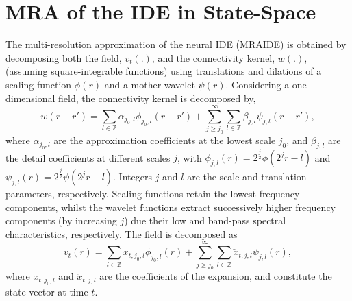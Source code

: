 \documentclass[journal,a4paper]{IEEEtran}
\newcommand{\dean}[1]{\textcolor{green}{#1}}
\begin{document}
\section{MRA of the IDE in State-Space}
The multi-resolution approximation of the neural IDE (MRAIDE) is obtained by decomposing both the field, $v_t(.)$, and the connectivity kernel, $w(.)$, (assuming square-integrable functions) using translations and dilations of a scaling function $\phi(r)$ and a mother wavelet $\psi(r)$. Considering a one-dimensional field, the connectivity kernel is decomposed by,
\begin{equation}
 w\left(r-r'\right)=\sum_{l \in \mathbb{Z}}\alpha_{j_0,l}\phi_{j_0,l}\left(r-r'\right)+\sum_{j\geq j_0}^{\infty} \sum_{l \in \mathbb{Z}}\beta_{j,l}\psi_{j,l}\left(r-r'\right), 
\label{eq:KernelExpansion}
\end{equation}
where $\alpha_{j_0,l}$ are the approximation coefficients at the lowest scale $j_0$, and $\beta_{j,l}$ are the detail coefficients at different scales $j$, with $\phi_{j,l}\left(r\right)=2^{\frac{j}{2}}\phi\left(2^jr-l\right) $ and $\psi_{j,l}\left(r\right)=2^{\frac{j}{2}}\psi\left(2^jr-l\right)$. Integers $j$ and $l$ are the scale and translation parameters, respectively. Scaling functions retain the lowest frequency components, whilst the wavelet functions extract successively higher frequency components (by increasing $j$) due their low and band-pass spectral characteristics, respectively. The field is decomposed as
\begin{equation}
 v_t\left(r\right)=\sum_{l \in \mathbb{Z}}x_{t,j_{0},l}\phi_{j_{0},l}\left(r\right)+\sum_{j\geq j_0}^{\infty} \sum_{l \in \mathbb{Z}} \check{x}_{t,j,l}\psi_{j,l}\left(r\right),
\label{eq:FieldExpansion}
\end{equation}
where $x_{t,j_{0},l}$ and $\check{x}_{t,j,l} $ are the coefficients of the expansion, and constitute the state vector at time $t$. %
\end{document}
